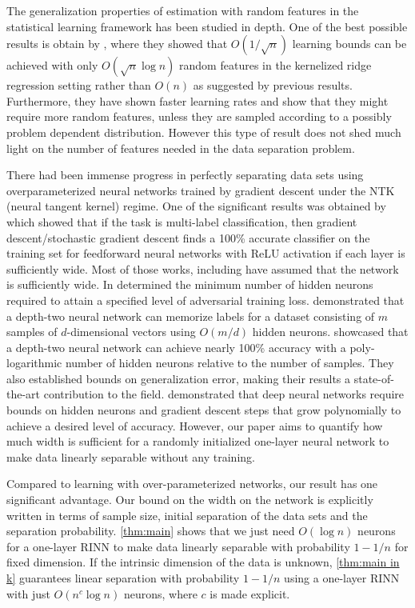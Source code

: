 \documentclass[aoap]{imsart}
\numberwithin{equation}{section}
\theoremstyle{definition}
\theoremstyle{remark}
\numberwithin{equation}{section}
\newcommand{\0}{\mathbf{0}}
\newcommand{\1}{\mathbf{1}}
\numberwithin{equation}{section}
\begin{document}
{The generalization properties of estimation with random features
in the statistical learning framework has been studied in depth. One of the best possible results is obtain by \cite{rudi2017generalization}, where they showed that $O(1/\sqrt{n})$ learning bounds can be achieved with only $O(\sqrt{n}\log n)$ random features in the kernelized ridge regression setting rather than $O(n)$
as suggested by previous results. Furthermore, they have shown faster learning rates and show
that they might require more random features, unless they are sampled according to
a possibly problem dependent distribution. However this type of result does not shed much light on the number of features needed in the data separation problem.

There had been immense progress in perfectly separating data sets using overparameterized neural networks trained by gradient descent under the NTK (neural tangent kernel) regime. 
One of the significant results was obtained by \cite{allen-zhu19GlobalConvergence} which showed that if the task is multi-label classification, then gradient descent/stochastic gradient descent finds a 100\% accurate classifier on the
training set for feedforward neural networks with ReLU activation if each layer is sufficiently wide. Most of those works, including \cite{jacot2018NTK,allen-zhu19GlobalConvergence, LiLiang2018learningoverparametrized, yun2019small} have assumed that the network is sufficiently wide. In \cite{Gao2019} determined the minimum number of hidden neurons required to attain a specified level of adversarial training loss. \cite{Daniely2020} demonstrated that a depth-two neural network can memorize labels for a dataset consisting of $m$ samples of $d$-dimensional vectors using $O(m/d)$ hidden neurons. \cite{Ji2020Polylogarithmic} showcased that a depth-two neural network can achieve nearly 100\% accuracy with a poly-logarithmic number of hidden neurons relative to the number of samples. They also established bounds on generalization error, making their results a state-of-the-art contribution to the field.
\cite{Oymak2019TowardMO} demonstrated that deep neural networks require bounds on hidden neurons and gradient descent steps that grow polynomially to achieve a desired level of accuracy.
However, our paper aims to quantify how much width is sufficient for a randomly initialized one-layer neural network to make data linearly separable without any training. 
 
Compared to learning with over-parameterized networks, our result has one significant advantage. Our bound on the width on the network is explicitly written in terms of sample size, initial separation of the data sets and the separation probability. \cref{thm:main} shows that we just need $O(\log n)$ neurons for a one-layer RINN to make data linearly separable with probability $1-1/n$ for fixed dimension. If the intrinsic dimension of the data is unknown, \cref{thm:main in k} guarantees linear separation with probability $1-1/n$ using a one-layer RINN with just $O(n^c\log n)$ neurons, where $c$ is made explicit.
} 
\end{document}
